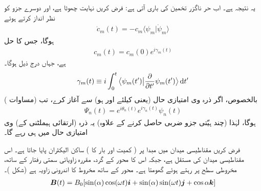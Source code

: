 یہ  نتیجہ ہے۔ اب حر ناگزر تخمین کی باری آتی ہے: فرض کریں  نہایت چھوٹا ہے، اور دوسرے جزو کو نظر انداز کرتے ہوئے 
\begin{align}
\dot{c}_m (t) = - c_m \langle \psi_m | \dot{\psi}_m \rangle
\end{align} 
ہوگا، جس کا حل 
\begin{align}\label{مساوات_حر_سی_ایم}
c_m (t) = c_m (0) e^{i \gamma_m (t)}
\end{align}
ہے، جہاں درج ذیل ہوگا۔
\begin{align}
\gamma_m (t) \equiv i \int_0^t \big\langle \psi_m (t') \big| \frac{\partial}{\partial t'} \psi_m (t') \big \rangle \dif t'
\end{align}
بالخصوص، اگر ذرہ  وی امتیازی حال (یعنی  کیلئے  اور  ہو) سے آغاز کرے، تب (مساوات ) 
\begin{align}\label{مساوات_حر_وہیں_رہتا_ہے}
\Psi_n (t) = e^{i \theta_n (t)} e^{i \gamma_n (t)} \psi_n (t)
\end{align}
ہوگا، لہٰذا (چند ہیّتی جزو ضربی حاصل کرنے کے علاوہ) یہ ذرہ (ارتقائی ہیملٹنی کے)  وی امتیازی حال میں ہی رہے گا۔

فرض کریں مقناطیسی میدان میں مبدا پر ( کمیت  اور بار  کا ) ساکن الیکٹران پایا جاتا ہے۔ اس مقناطیسی میدان کی   مستقل ہے، جبکہ اس کا   محور کے گرد، مقررہ زاویائی سمتی رفتار  کے ساتھ، مخروطی سطح پر رہتے ہوئے گھومتا ہے۔ محور  کے ساتھ مخروط کا اندرونی
 زاویہ  ہے (شکل )۔
\begin{align}\label{مساوات_حر_مخروط_مقناطیسی_میدان}
{\ensuremath{{\boldsymbol{B}}}} (t) = B_0 [\sin(\alpha) \cos(\omega t) {\boldsymbol{i}} + \sin(\alpha) \sin(\omega t) {\boldsymbol{j}} + \cos \alpha {\boldsymbol{k}}]
\end{align}

